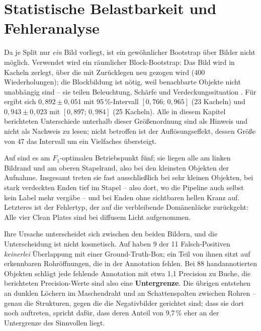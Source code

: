 \fi

\section{Statistische Belastbarkeit und Fehleranalyse}
\label{sec:bootstrap}

Da je Split nur \emph{ein} Bild vorliegt, ist ein gewöhnlicher Bootstrap über
Bilder nicht möglich. Verwendet wird ein räumlicher Block-Bootstrap: Das Bild wird
in Kacheln zerlegt, über die mit Zurücklegen neu gezogen wird (400
Wiederholungen); die Blockbildung ist nötig, weil benachbarte Objekte nicht
unabhängig sind -- sie teilen Beleuchtung, Schärfe und Verdeckungssituation
\parencite{kuensch1989,efron1993}. Für \mAPfifty{} ergibt sich 
$0{,}892 \pm 0{,}051$ mit 95\,\%-Intervall $[0{,}766;\,0{,}965]$ (23 Kacheln) und
 $0{,}943 \pm 0{,}023$ mit $[0{,}897;\,0{,}984]$ (25 Kacheln). Alle in
diesem Kapitel berichteten Unterschiede unterhalb dieser Größenordnung sind als
Hinweis und nicht als Nachweis zu lesen; nicht betroffen ist der
Auflösungseffekt, dessen Größe von 47\PP{} das Intervall um ein Vielfaches
übersteigt.

 Auf  sind es am $F_1$-optimalen
Betriebspunkt fünf; sie liegen alle am linken Bildrand und am oberen Stapelrand,
also bei den kleinsten Objekten der Aufnahme. Insgesamt treten sie fast
ausschließlich bei sehr kleinen Objekten, bei stark verdeckten
Enden tief im Stapel -- also dort, wo die Pipeline auch selbst kein Label mehr
vergäbe -- und bei Enden ohne sichtbaren hellen Kranz auf. Letzteres ist der
Fehlertyp, der auf die verbleibende Domänenlücke zurückgeht: Alle vier Clean
Plates sind bei diffusem Licht aufgenommen.

 Ihre Ursache unterscheidet sich zwischen den beiden
Bildern, und die Unterscheidung ist nicht kosmetisch. Auf  haben 9 der
11 Falsch-Positiven \emph{keinerlei} Überlappung mit einer Ground-Truth-Box; ein
Teil von ihnen sitzt auf erkennbaren Rohröffnungen, die in der Annotation fehlen.
Bei 88 handannotierten Objekten schlägt jede fehlende Annotation mit etwa
1,1\PP{} Precision zu Buche, die berichteten Precision-Werte sind also eine
\textbf{Untergrenze}. Die übrigen entstehen an dunklen Löchern im Maschendraht
und an Schattenspalten zwischen Rohren -- genau die Strukturen, gegen die die
Negativbilder gerichtet sind; dass sie dort noch auftreten, spricht dafür, dass
deren Anteil von 9,7\,\% eher an der Untergrenze des Sinnvollen liegt.

